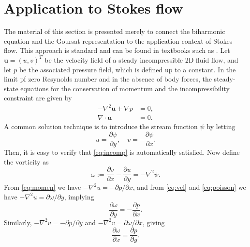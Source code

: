 \documentclass{article}
\renewcommand{\vec}[1]{\mathbf{#1}}
\begin{document}
\section{Application to Stokes flow \label{sec:physics}}

The material of this section is presented merely to connect the biharmonic
equation and the Goursat representation to the application context of Stokes
flow. This approach is standard and can be found in textbooks such as
\cite{ockendon95}. Let $\vec{u}=(u,v)^T$ be the velocity field of a steady
incompressible 2D fluid flow, and let $p$ be the associated pressure field,
which is defined up to a constant. In the limit pf zero Resynolds number and in
the absence of body forces, the steady-state equations for the conservation of
momentum and the incompressibility constraint are given by
\begin{subequations}\label{eq:stokes}
\begin{align}
-\nabla^2 \vec{u} + \nabla p &= 0,\label{eq:momen}\\
\nabla\cdot\vec{u} &= 0. \label{eq:incomp}
\end{align}
\end{subequations}
A common solution technique is to introduce the stream function $\psi$ by letting
\begin{equation}\label{eq:vel}
u=\frac{\partial\psi}{\partial y}, \quad 
v=-\frac{\partial\psi}{\partial x}.
\end{equation}
Then, it is easy to verify that \eqref{eq:incomp} is automatically satisfied.
Now define the vorticity as
\begin{equation} \label{eq:poisson}
\omega := \frac{\partial v}{\partial x}-\frac{\partial u}{\partial y}  = -\nabla^2 \psi.
\end{equation}
From \eqref{eq:momen} we have $-\nabla^2 u = -\partial p/\partial x$, and from
\eqref{eq:vel} and \eqref{eq:poisson} we have $-\nabla^2 u
=\partial\omega/\partial y$, implying 
\begin{equation}
\frac{\partial \omega}{\partial y} = -\frac{\partial p}{\partial x}.
\end{equation}
Similarly, $-\nabla^2 v=-\partial p/\partial y$ and $-\nabla^2 v =\partial
\omega/\partial x$, giving
\begin{equation}
\frac{\partial\omega}{\partial x}=\frac{\partial p}{\partial y}.
\end{equation}
\end{document}
